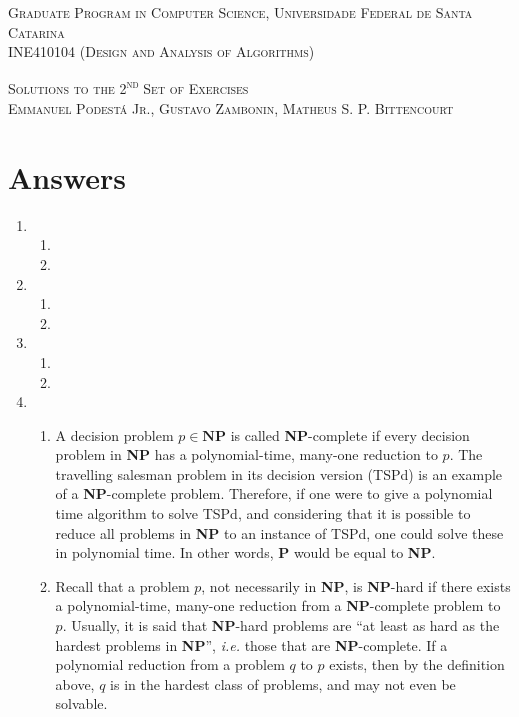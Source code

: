 \documentclass[12pt]{article}
\begin{document}
\textsc{Graduate Program in Computer Science,
  Universidade Federal de Santa Catarina} \\
\textsc{INE410104 (Design and Analysis of Algorithms)}

\textsc{Solutions to the 2\textsuperscript{nd} Set of Exercises} \\
\textsc{Emmanuel Podestá Jr., Gustavo Zambonin, Matheus S. P. Bittencourt}

\section{Answers}

\begin{enumerate}
  \item
  \begin{enumerate}
    \item 
    \item 
  \end{enumerate}
  \item
  \begin{enumerate}
    \item 
    \item 
  \end{enumerate}
  \item
  \begin{enumerate}
    \item 
    \item 
  \end{enumerate}
  \item 
  \begin{enumerate}
    \item A decision problem $p \in \mathbf{NP}$ is called \textbf{NP}-complete if every decision problem in \textbf{NP} has a polynomial-time, many-one reduction to $p$. The travelling salesman problem in its decision version (TSPd) is an example of a \textbf{NP}-complete problem. Therefore, if one were to give a polynomial time algorithm to solve TSPd, and considering that it is possible to reduce all problems in \textbf{NP} to an instance of TSPd, one could solve these in polynomial time. In other words, \textbf{P} would be equal to \textbf{NP}.
    \item Recall that a problem $p$, not necessarily in \textbf{NP}, is \textbf{NP}-hard if there exists a polynomial-time, many-one reduction from a \textbf{NP}-complete problem to $p$. Usually, it is said that \textbf{NP}-hard problems are ``at least as hard as the hardest problems in \textbf{NP}'', \emph{i.e.} those that are \textbf{NP}-complete. If a polynomial reduction from a problem $q$ to $p$ exists, then by the definition above, $q$ is in the hardest class of problems, and may not even be solvable.

\end{enumerate}
\end{enumerate}
\end{document}
